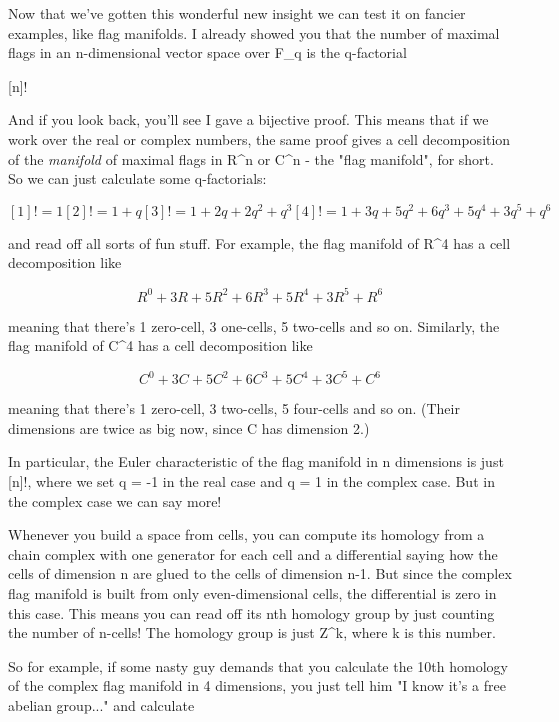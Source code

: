 Now that we've gotten this wonderful new insight we can test it on
fancier examples, like flag manifolds.  I already showed you that the
number of maximal flags in an n-dimensional vector space over F_{q} is 
the q-factorial 

[n]!  


And if you look back, you'll see I gave a bijective proof.  This means
that if we work over the real or complex numbers, the same proof gives a
cell decomposition of the \emph{manifold} of maximal flags in
R^{n} or C^{n} - the "flag manifold", for
short.  So we can just calculate some q-factorials:


$$

[1]! = 1 
[2]! = 1 + q
[3]! = 1 + 2q + 2q^{2} +  q^{3}
[4]! = 1 + 3q + 5q^{2} + 6q^{3} + 5q^{4} + 3q^{5} + q^{6}
$$
    
and read off all sorts of fun stuff.  For example, the flag manifold
of R^{4} has a cell decomposition like


$$

     R^{0} + 3R + 5R^{2} + 6R^{3} + 5R^{4} + 3R^{5} + R^{6}
$$
    
meaning that there's 1 zero-cell, 3 one-cells, 5 two-cells and so on.
Similarly, the flag manifold of C^{4} has a cell decomposition like


$$

     C^{0} + 3C + 5C^{2} + 6C^{3} + 5C^{4} + 3C^{5} + C^{6}
$$
    
meaning that there's 1 zero-cell, 3 two-cells, 5 four-cells and so on.
(Their dimensions are twice as big now, since C has dimension 2.)

In particular, the Euler characteristic of the flag manifold in 
n dimensions is just [n]!, where we set q = -1 in the real case and 
q = 1 in the complex case.  But in the complex case we can say more!

Whenever you build a space from cells, you can compute its homology from
a chain complex with one generator for each cell and a differential
saying how the cells of dimension n are glued to the cells of dimension
n-1.   But since the complex flag manifold is built from only
even-dimensional cells, the differential is zero in this case.  This
means you can read off its nth homology group by just counting the
number of n-cells!  The homology group is just Z^{k}, 
where k is this number.

So for example, if some nasty guy demands that you calculate the 10th
homology of the complex flag manifold in 4 dimensions, you just tell
him "I know it's a free abelian group..." and calculate 


